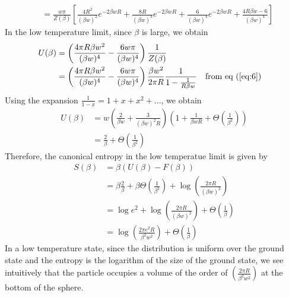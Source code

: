 \documentclass[letterpaper,english,12pt]{article}
\begin{document}
\begin{exmp}[Sphere]
\begin{align}
	&= \frac{w \pi}{Z(\beta)} \left[ \frac{4R^2}{(\beta w)^2}e^{-2 \beta wR} + \frac{8R}{(\beta w)^3}e^{-2 \beta wR} + \frac{6}{(\beta w)^4}e^{-2 \beta wR} + \frac{4R\beta w - 6}{(\beta w)^4} \right] 
\end{align}
In the low temperature limit, since $\beta$ is large, we obtain
\begin{align}
U(\beta) &= \left( \frac{4 \pi R \beta w^2}{(\beta w)^4} - \frac{6w \pi}{(\beta w)^4} \right) \frac{1}{Z(\beta)} \nonumber \\
	&= \left( \frac{4 \pi R \beta w^2}{(\beta w)^4} - \frac{6w \pi}{(\beta w)^4} \right) \frac{\beta w^2}{2 \pi R} \frac{1}{1 - \frac{1}{R \beta w}} \nonumber && \text{from eq (\ref{eq:6})}
\end{align}
Using the expansion $\frac{1}{1-x} = 1 + x + x^2 + ...$, we obtain
\begin{align}
U(\beta) &= w \left( \frac{2}{\beta w} + \frac{3}{(\beta w)^2 R} \right) \left( 1 + \frac{1}{\beta w R} + \Theta\left(\frac{1}{\beta ^ 2}\right) \right) \nonumber \\
	&= \frac{2}{\beta} + \Theta\left(\frac{1}{\beta^2}\right)
\end{align}
Therefore, the canonical entropy in the low temperatue limit is given by
\begin{align}
S(\beta) &= \beta ( U(\beta) - F(\beta) ) \nonumber \\
	&= \beta \frac{2}{\beta} + \beta \Theta\left(\frac{1}{\beta^2}\right) + \log \left( \frac{2 \pi R}{(\beta w)^2} \right) \nonumber \\
	&= \log e^2 + \log \left( \frac{2 \pi R}{(\beta w)^2} \right) + \Theta\left(\frac{1}{\beta}\right) \nonumber \\
	&= \log \left( \frac{2 \pi e^2 R}{\beta^2 w^2} \right) + \Theta\left(\frac{1}{\beta}\right)
\end{align}
In a low temperature state, since the distribution is uniform over the ground state and the entropy is the logarithm of the size of the ground state, we see intuitively that the particle occupies a volume of the order of $\left( \frac{2 \pi R}{\beta^2 w^2} \right)$ at the bottom of the sphere.
\end{exmp}
\end{document}
